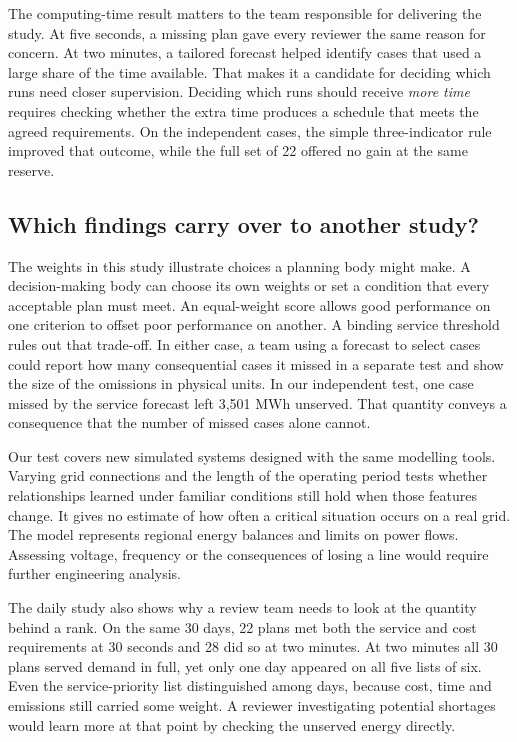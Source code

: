 \documentclass[11pt,a4paper]{article}
\begin{document}
The computing-time result matters to the team responsible for delivering the study. At five seconds, a missing plan gave every reviewer the same reason for concern. At two minutes, a tailored forecast helped identify cases that used a large share of the time available. That makes it a candidate for deciding which runs need closer supervision. Deciding which runs should receive \emph{more time} requires checking whether the extra time produces a schedule that meets the agreed requirements. On the independent cases, the simple three-indicator rule improved that outcome, while the full set of 22 offered no gain at the same reserve.

\subsection{Which findings carry over to another study?}

The weights in this study illustrate choices a planning body might make. A decision-making body can choose its own weights or set a condition that every acceptable plan must meet. An equal-weight score allows good performance on one criterion to offset poor performance on another. A binding service threshold rules out that trade-off. In either case, a team using a forecast to select cases could report how many consequential cases it missed in a separate test and show the size of the omissions in physical units. In our independent test, one case missed by the service forecast left 3,501 MWh unserved. That quantity conveys a consequence that the number of missed cases alone cannot.

Our test covers new simulated systems designed with the same modelling tools. Varying grid connections and the length of the operating period tests whether relationships learned under familiar conditions still hold when those features change. It gives no estimate of how often a critical situation occurs on a real grid. The model represents regional energy balances and limits on power flows. Assessing voltage, frequency or the consequences of losing a line would require further engineering analysis.

The daily study also shows why a review team needs to look at the quantity behind a rank. On the same 30 days, 22 plans met both the service and cost requirements at 30 seconds and 28 did so at two minutes. At two minutes all 30 plans served demand in full, yet only one day appeared on all five lists of six. Even the service-priority list distinguished among days, because cost, time and emissions still carried some weight. A reviewer investigating potential shortages would learn more at that point by checking the unserved energy directly.
\end{document}
